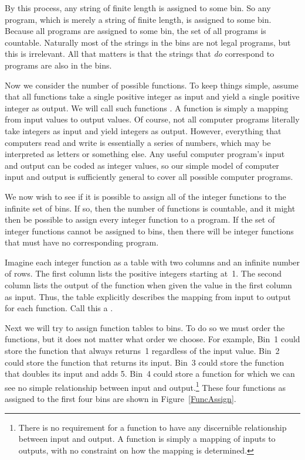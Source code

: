 By this process, any string of finite length is assigned
to some bin.
So any program, which is merely a string of finite length, is
assigned to some bin.
Because all programs are assigned to some bin, the set of all programs
is countable.
Naturally most of the strings in the bins are not legal programs, but
this is irrelevant.
All that matters is that the strings that \emph{do} correspond to
programs are also in the bins.

Now we consider the number of possible functions.
To keep things simple, assume that all functions take a single
positive integer as input and yield a single positive integer as
output.
We will call such functions .
A function is simply a mapping from input values to output values.
Of course, not all computer programs literally take integers as input
and yield integers as output.
However, everything that computers read and write is
essentially a series of numbers, which may be interpreted as letters
or something else.
Any useful computer program's input and output can be coded as integer
values, so our simple model of computer input and output is
sufficiently general to cover all possible computer programs.

We now wish to see if it is possible to assign all of the integer
functions to the infinite set of bins.
If so, then the number of functions is countable, and it might then be
possible to assign every integer function to a program.
If the set of integer functions cannot be assigned to bins, then
there will be integer functions that must have no corresponding program.

Imagine each integer function as a table with two columns and an
infinite number of rows.
The first column lists the positive integers starting at~1.
The second column lists the output of the function when given the value
in the first column as input.
Thus, the table explicitly describes the mapping from input to output
for each function.
Call this a .

Next we will try to assign function tables to bins.
To do so we must order the functions, but it does not matter what
order we choose.
For example, Bin~1 could store the function that always returns~1
regardless of the input value.
Bin~2 could store the function that returns its input.
Bin~3 could store the function that doubles its input and adds 5.
Bin~4 could store a function for which we can see no simple
relationship between input and output.\footnote{There is no
requirement for a function to have any discernible relationship
between input and output.
A function is simply a mapping of inputs to outputs, with no
constraint on how the mapping is determined.}
These four functions as assigned to the first four bins are shown in
Figure~\ref{FuncAssign}.

